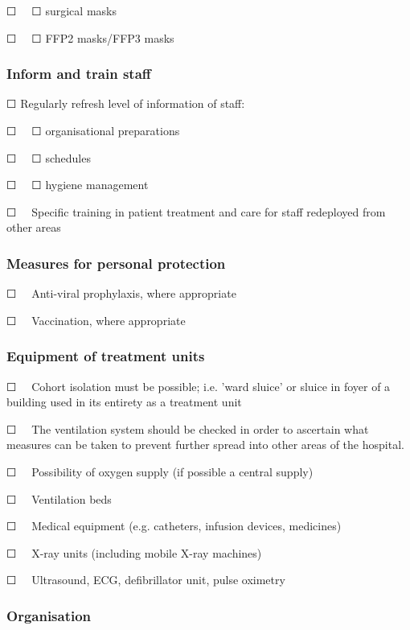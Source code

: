 \documentclass{article}
\begin{document}
☐   ☐ surgical masks


☐   ☐ FFP2 masks/FFP3 masks 


\subsubsection{Inform and train staff}\label{H5485324}



☐ Regularly refresh level of information of staff: 


☐   ☐ organisational preparations


☐   ☐ schedules 


☐   ☐ hygiene management


☐   Specific training in patient treatment and care for staff redeployed from other areas


\subsubsection{Measures for personal protection}\label{H2576398}



☐   Anti-viral prophylaxis, where appropriate


☐   Vaccination, where appropriate 


\subsubsection{Equipment of treatment units}\label{H2443189}



☐   Cohort isolation must be possible; i.e. 'ward sluice' or sluice in foyer of a building used in its entirety as a treatment unit


☐   The ventilation system should be checked in order to ascertain what measures can be taken to prevent further spread into other areas of the hospital.


☐   Possibility of oxygen supply (if possible a central supply)


☐   Ventilation beds


☐   Medical equipment (e.g. catheters, infusion devices, medicines)


☐   X-ray units (including mobile X-ray machines)


☐   Ultrasound, ECG, defibrillator unit, pulse oximetry  


\subsubsection{Organisation}\label{H5831071}
\end{document}
